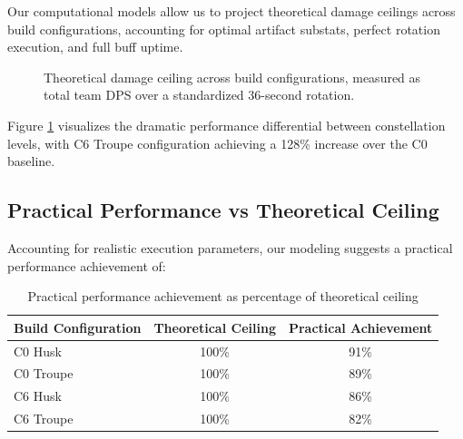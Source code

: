 \documentclass[12pt,a4paper]{article}
\begin{document}
Our computational models allow us to project theoretical damage ceilings across build configurations, accounting for optimal artifact substats, perfect rotation execution, and full buff uptime.

\begin{figure}[H]
\centering
{}
\caption{Theoretical damage ceiling across build configurations, measured as total team DPS over a standardized 36-second rotation.}
\label{fig:damage_ceiling}
\end{figure}

Figure \ref{fig:damage_ceiling} visualizes the dramatic performance differential between constellation levels, with C6 Troupe configuration achieving a 128\% increase over the C0 baseline.

\subsection{Practical Performance vs Theoretical Ceiling}

Accounting for realistic execution parameters, our modeling suggests a practical performance achievement of:

\begin{table}[h]
\centering
\begin{tabular}{lcc}
\toprule
\textbf{Build Configuration} & \textbf{Theoretical Ceiling} & \textbf{Practical Achievement} \\
\midrule
C0 Husk & 100\% & 91\% \\
C0 Troupe & 100\% & 89\% \\
C6 Husk & 100\% & 86\% \\
C6 Troupe & 100\% & 82\% \\
\bottomrule
\end{tabular}
\caption{Practical performance achievement as percentage of theoretical ceiling}
\label{tab:practical_performance}
\end{table}
\end{document}

